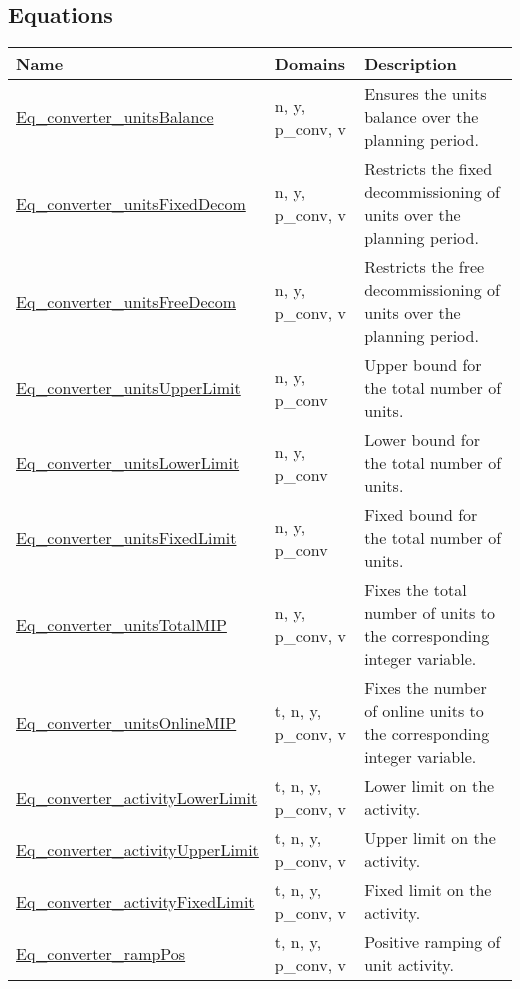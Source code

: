 \documentclass[11pt]{article}
\begin{document}
\subsection*{Equations}
\begin{tabularx}{\textwidth}{| l | l | X |} 
\hline 
\textbf{Name} & \textbf{Domains} & \textbf{Description}\\ 
\hline 
\endhead 
\hyperref[Eq_converter_unitsBalance]{Eq\_converter\_unitsBalance}  & n, y, p\_conv, v & Ensures the units balance over the planning period. \\ 
\hyperref[Eq_converter_unitsFixedDecom]{Eq\_converter\_unitsFixedDecom}  & n, y, p\_conv, v & Restricts the fixed decommissioning of units over the planning period. \\ 
\hyperref[Eq_converter_unitsFreeDecom]{Eq\_converter\_unitsFreeDecom}  & n, y, p\_conv, v & Restricts the free decommissioning of units over the planning period. \\ 
\hyperref[Eq_converter_unitsUpperLimit]{Eq\_converter\_unitsUpperLimit}  & n, y, p\_conv & Upper bound for the total number of units. \\ 
\hyperref[Eq_converter_unitsLowerLimit]{Eq\_converter\_unitsLowerLimit}  & n, y, p\_conv & Lower bound for the total number of units. \\ 
\hyperref[Eq_converter_unitsFixedLimit]{Eq\_converter\_unitsFixedLimit}  & n, y, p\_conv & Fixed bound for the total number of units. \\ 
\hyperref[Eq_converter_unitsTotalMIP]{Eq\_converter\_unitsTotalMIP}  & n, y, p\_conv, v & Fixes the total number of units to the corresponding integer variable. \\ 
\hyperref[Eq_converter_unitsOnlineMIP]{Eq\_converter\_unitsOnlineMIP}  & t, n, y, p\_conv, v & Fixes the number of online units to the corresponding integer variable. \\ 
\hyperref[Eq_converter_activityLowerLimit]{Eq\_converter\_activityLowerLimit}  & t, n, y, p\_conv, v & Lower limit on the activity. \\ 
\hyperref[Eq_converter_activityUpperLimit]{Eq\_converter\_activityUpperLimit}  & t, n, y, p\_conv, v & Upper limit on the activity. \\ 
\hyperref[Eq_converter_activityFixedLimit]{Eq\_converter\_activityFixedLimit}  & t, n, y, p\_conv, v & Fixed limit on the activity. \\ 
\hyperref[Eq_converter_rampPos]{Eq\_converter\_rampPos}  & t, n, y, p\_conv, v & Positive ramping of unit activity. \\ 

\end{tabularx}
\end{document}
